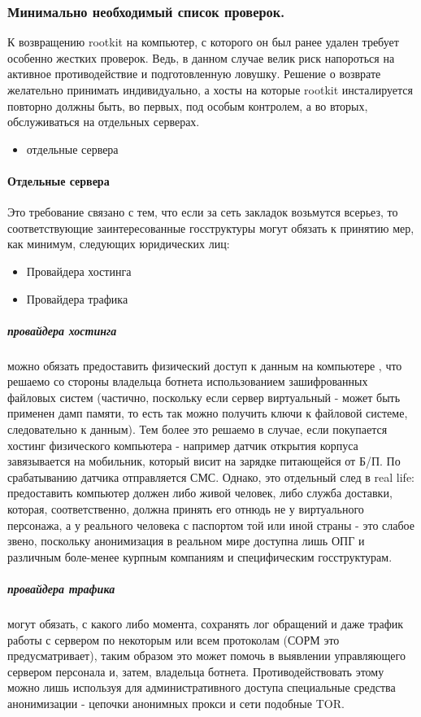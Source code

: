 \subsubsection{Минимально необходимый список проверок.}

К возвращению rootkit на компьютер, с которого он был ранее удален
требует особенно жестких проверок. Ведь, в данном случае
{ велик риск напороться на активное
противодействие и подготовленную ловушку}. Решение о возврате желательно
принимать индивидуально, а хосты на которые rootkit инсталируется
повторно должны быть, во первых, под особым контролем, а во вторых,
обслуживаться на  отдельных серверах.

\begin{itemize}
\item{отдельные сервера}
\end{itemize}

\paragraph{Отдельные сервера}

Это требование связано с тем, что если за сеть закладок возьмутся
всерьез, то соответствующие  заинтересованные госструктуры могут обязать
к принятию мер, как минимум, следующих  юридических лиц:

\begin{itemize}
\item{Провайдера хостинга}
\item{Провайдера трафика}
\end{itemize}

\subparagraph{провайдера хостинга} можно обязать  предоставить
физический доступ к данным на компьютере , что решаемо со стороны
владельца ботнета использованием зашифрованных файловых систем (частично,
поскольку если сервер виртуальный - может быть применен дамп памяти, то
есть так  можно получить ключи к файловой системе, следовательно к данным).
Тем более это решаемо в случае, если покупается хостинг физического
компьютера - например датчик открытия корпуса завязывается на мобильник,
 который  висит на зарядке питающейся от Б/П. По срабатыванию датчика
отправляется СМС. Однако, это отдельный след в real life: предоставить
компьютер должен либо живой человек, либо  служба доставки, которая,
соответственно, должна принять его отнюдь не у виртуального персонажа,
а у реального человека с паспортом той или иной страны - это слабое звено,
поскольку анонимизация в реальном мире доступна лишь ОПГ и различным
боле-менее курпным компаниям и специфическим госструктурам.

\subparagraph{провайдера трафика} могут обязать, с какого либо момента, сохранять
лог обращений и даже трафик работы с сервером по некоторым или всем протоколам
(СОРМ это предусматривает), таким образом это может помочь в выявлении управляющего
сервером персонала и, затем, владельца ботнета. Противодействовать этому можно лишь
используя для административного доступа специальные средства анонимизации - цепочки
 анонимных прокси и сети подобные TOR.
